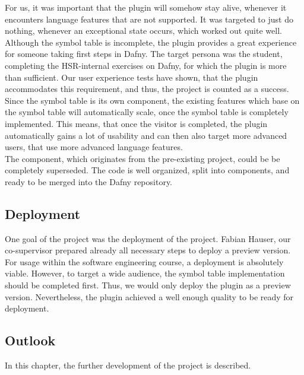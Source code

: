 For us, it was important that the plugin will somehow stay alive, whenever it encounters language features that are not supported.
It was targeted to just do nothing, whenever an exceptional state occurs, which worked out quite well.\\

Although the symbol table is incomplete, the plugin provides a great experience for someone taking first steps in Dafny.
The target persona was the student, completing the HSR-internal exercises on Dafny, for which the plugin is more than sufficient.
Our user experience tests have shown, that the plugin accommodates this requirement, and thus, the project is counted as a success.\\

Since the symbol table is its own component, the existing features which base on the symbol table will automatically scale, once the symbol table is completely implemented.
This means, that once the visitor is completed, the plugin automatically gains a lot of usability and can then also target more advanced users, that use more advanced language features.\\

The  component, which originates from the pre-existing project, could be be completely superseded.
The code is well organized, split into components, and ready to be merged into the Dafny repository. 

\subsection{Deployment} 
One goal of the project was the deployment of the project.
Fabian Hauser, our co-supervisor prepared already all necessary steps to deploy a preview version.
For usage within the software engineering course, a deployment is absolutely viable.
However, to target a wide audience, the symbol table implementation should be completed first.
Thus, we would only deploy the plugin as a preview version.
Nevertheless, the plugin achieved a well enough quality to be ready for deployment.

\subsection{Outlook}
In this chapter, the further development of the project is described.

